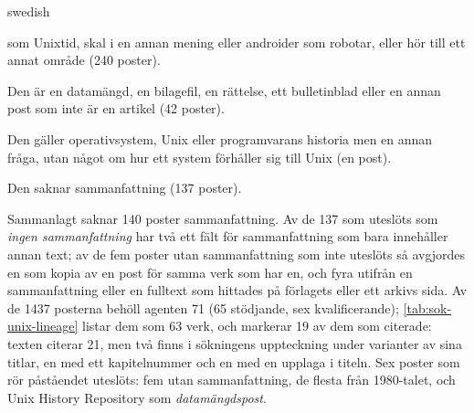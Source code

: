 \begin{onlyin}{swedish}
\begin{description}
    som Unixtid, skal i en annan mening eller androider som robotar,
    eller hör till ett annat område (240 poster).
  \item[Datamängdspost] Den är en datamängd, en bilagefil, en rättelse,
    ett bulletinblad eller en annan post som inte är en artikel (42
    poster).
  \item[Annan fråga] Den gäller operativsystem, Unix eller programvarans
    historia men en annan fråga, utan något om hur ett system förhåller
    sig till Unix (en post).
  \item[Ingen sammanfattning] Den saknar sammanfattning (137 poster).
\end{description}
Sammanlagt saknar 140 poster sammanfattning.  Av de 137 som uteslöts som
\emph{ingen sammanfattning} har två ett fält för sammanfattning som bara
innehåller annan text; av de fem poster utan sammanfattning som inte
uteslöts så avgjordes en som kopia av en post för samma verk som har en,
och fyra utifrån en sammanfattning eller en fulltext som hittades på
förlagets eller ett arkivs sida.  Av de 1437 posterna behöll agenten 71
(65 stödjande, sex kvalificerande); \cref{tab:sok-unix-lineage} listar
dem som 63 verk, och markerar 19 av dem som citerade: texten citerar 21,
men två finns i sökningens uppteckning under varianter av sina titlar,
en med ett kapitelnummer och en med en upplaga i titeln.  Sex poster som rör
påståendet uteslöts: fem utan sammanfattning, de flesta från 1980-talet,
och Unix History Repository som \emph{datamängdspost}.
\end{onlyin}

\section{} %
\label{sec:unix-lineage-results}

